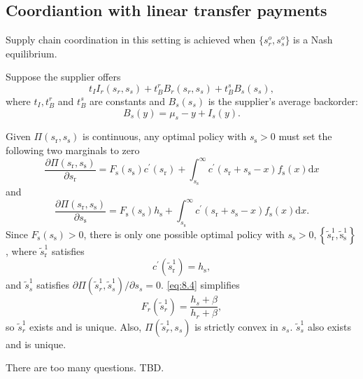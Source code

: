 \subsection{Coordiantion with linear transfer payments}
Supply chain coordination in this setting is achieved when $\{s_r^o,s_s^o\}$ is a Nash equilibrium. 

Suppose the supplier offers
\begin{equation*}
    t_I I_r(s_r,s_s)+t_B^r B_r(s_r,s_s)+t_B^s B_s(s_s),
\end{equation*}
where $t_I, t_B^r$ and $t_B^s$ are constants and $B_s(s_s)$ is the supplier's average backorder:
\begin{equation*}
    B_s(y)=\mu_s-y+I_s(y).
\end{equation*}

Given $\Pi\left(s_{\mathrm{r}}, s_{\mathrm{s}}\right)$ is continuous, any optimal policy with $s_{\mathrm{s}}>0$ must set the following two marginals to zero
\begin{equation}
    \frac{\partial \Pi\left(s_{\mathrm{r}}, s_{\mathrm{s}}\right)}{\partial s_{\mathrm{r}}}=F_{\mathrm{s}}\left(s_{\mathrm{s}}\right) c^{\prime}\left(s_{\mathrm{r}}\right)+\int_{s_{\mathrm{s}}}^{\infty} c^{\prime}\left(s_{\mathrm{r}}+s_{\mathrm{s}}-x\right) f_{\mathrm{s}}(x) \mathrm{d} x
\end{equation}
and
\begin{equation}
    \frac{\partial \Pi\left(s_{\mathrm{r}}, s_{\mathrm{s}}\right)}{\partial s_{\mathrm{s}}}=F_{\mathrm{s}}\left(s_{\mathrm{s}}\right) h_{\mathrm{s}}+\int_{s_{\mathrm{s}}}^{\infty} c^{\prime}\left(s_{\mathrm{r}}+s_{\mathrm{s}}-x\right) f_{\mathrm{s}}(x) \mathrm{d} x .
\end{equation}
Since $F_{\mathrm{s}}\left(s_{\mathrm{s}}\right)>0$, there is only one possible optimal policy with $s_{\mathrm{s}}>0,\left\{\tilde{s}_{\mathrm{r}}^{1}, \tilde{\mathrm{s}}_{\mathrm{s}}^{1}\right\}$, where $\tilde{s}_{\mathrm{r}}^{1}$ satisfies
\begin{equation}\label{eq:8.4}
    c^{\prime}\left(\tilde{s}_{\mathrm{r}}^{1}\right)=h_{\mathrm{s}},
\end{equation}
and $\tilde{s}_s^1$ satisfies $\partial\Pi(\tilde{s}_r^1,\tilde{s}_s^1)/\partial s_s=0$. \autoref{eq:8.4} simplifies 
\begin{equation*}
    F_r(\tilde{s}_r^1)=\frac{h_s+\beta}{h_r+\beta},
\end{equation*}
so $\tilde{s}_r^1$ exists and is unique. Also, $\Pi(\tilde{s}_r^1,s_s)$ is strictly convex in $s_s$. $\tilde{s}_s^1$ also exists and is unique.

\begin{note}
    There are too many questions. TBD.
\end{note}







